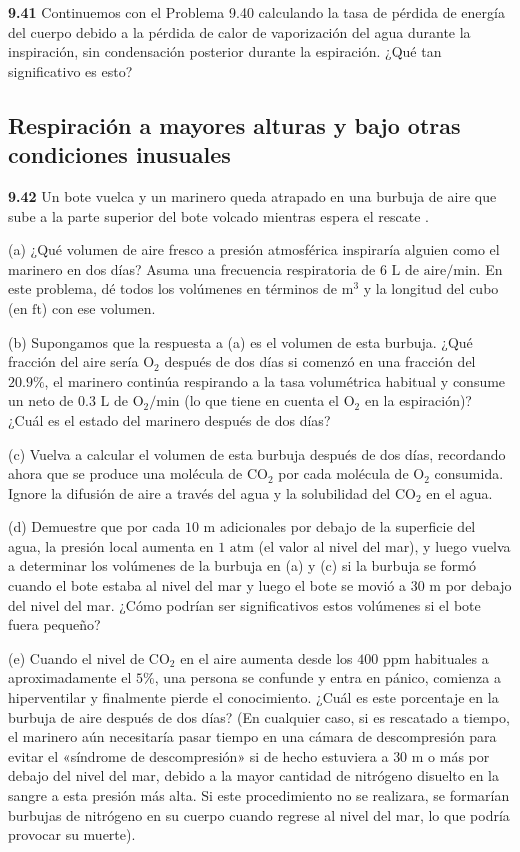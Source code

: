 \documentclass[12pt]{book}
\begin{document}
\noindent \textbf{9.41} Continuemos con el Problema 9.40 calculando la tasa de pérdida de energía del cuerpo debido a la pérdida de calor de vaporización del agua durante la inspiración, sin condensación posterior durante la espiración. ¿Qué tan significativo es esto?

\subsection*{Respiración a mayores alturas y bajo otras condiciones inusuales}

\noindent \textbf{9.42} Un bote vuelca y un marinero queda atrapado en una burbuja de aire que sube a la parte superior del bote volcado mientras espera el rescate \cite{21, 35}.
\par\noindent (a) ¿Qué volumen de aire fresco a presión atmosférica inspiraría alguien como el marinero en dos días? Asuma una frecuencia respiratoria de $6\text{ L de aire/min}$. En este problema, dé todos los volúmenes en términos de $\text{m}^3$ y la longitud del cubo (en $\text{ft}$) con ese volumen.
\par\noindent (b) Supongamos que la respuesta a (a) es el volumen de esta burbuja. ¿Qué fracción del aire sería $\text{O}_2$ después de dos días si comenzó en una fracción del $20.9\%$, el marinero continúa respirando a la tasa volumétrica habitual y consume un neto de $0.3\text{ L de }\text{O}_2/\text{min}$ (lo que tiene en cuenta el $\text{O}_2$ en la espiración)? ¿Cuál es el estado del marinero después de dos días?
\par\noindent (c) Vuelva a calcular el volumen de esta burbuja después de dos días, recordando ahora que se produce una molécula de $\text{CO}_2$ por cada molécula de $\text{O}_2$ consumida. Ignore la difusión de aire a través del agua y la solubilidad del $\text{CO}_2$ en el agua.
\par\noindent (d) Demuestre que por cada $10\text{ m}$ adicionales por debajo de la superficie del agua, la presión local aumenta en $1\text{ atm}$ (el valor al nivel del mar), y luego vuelva a determinar los volúmenes de la burbuja en (a) y (c) si la burbuja se formó cuando el bote estaba al nivel del mar y luego el bote se movió a $30\text{ m}$ por debajo del nivel del mar. ¿Cómo podrían ser significativos estos volúmenes si el bote fuera pequeño?
\par\noindent (e) Cuando el nivel de $\text{CO}_2$ en el aire aumenta desde los $400\text{ ppm}$ habituales a aproximadamente el $5\%$, una persona se confunde y entra en pánico, comienza a hiperventilar y finalmente pierde el conocimiento. ¿Cuál es este porcentaje en la burbuja de aire después de dos días? (En cualquier caso, si es rescatado a tiempo, el marinero aún necesitaría pasar tiempo en una cámara de descompresión para evitar el «síndrome de descompresión» si de hecho estuviera a $30\text{ m}$ o más por debajo del nivel del mar, debido a la mayor cantidad de nitrógeno disuelto en la sangre a esta presión más alta. Si este procedimiento no se realizara, se formarían burbujas de nitrógeno en su cuerpo cuando regrese al nivel del mar, lo que podría provocar su muerte).
\end{document}
